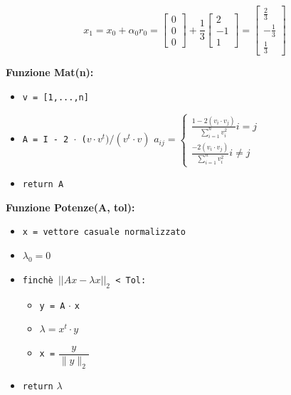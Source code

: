 \documentclass[12pt,a4paper]{article}
\begin{document}
\[
x_1 = x_0 + \alpha_0 r_0 = \begin{bmatrix} 0 \\ 0 \\ 0 \end{bmatrix} + \frac{1}{3} \begin{bmatrix} 2 \\ -1 \\ 1 \end{bmatrix} = \begin{bmatrix} \frac{2}{3} \\ -\frac{1}{3} \\ \frac{1}{3} \end{bmatrix}
\]
\newpage
\noindent
{}

\vspace{1em}
\textbf{Funzione Mat(n):}
\begin{itemize}
  \item \texttt{v = [1,...,n]}
  \item \texttt{A = I - 2 $\cdot$ ($v \cdot v^t) / (v^t \cdot v)$} \Rightarrow   $a_{ij} = \begin{cases} \frac{1-2(v_i \cdot v_j)}{\sum_{i=1}^{n}v_i^2} i=j\\ 
   \frac{-2(v_i \cdot v_j)}{\sum_{i=1}^{n}v_i^2} i\not=j
  
  \end{cases}$
  \item \texttt{return A}
\end{itemize}

\vspace{0.5em}
\textbf{Funzione Potenze(A, tol):}
\begin{itemize}
  \item \texttt{x = vettore casuale normalizzato}
  \item $\lambda_0 = 0$
  \item \texttt{finchè $||Ax-\lambda x||_2$ < Tol:}
  \begin{itemize}
    \item \texttt{y = A} $\cdot$ \texttt{x}
    \item $\lambda = x^t \cdot y$
    \item \texttt{x =} $\dfrac{y}{\lVert y \rVert_2}$
  \end{itemize}
  \item \texttt{return} $\lambda$
\end{itemize}
\end{document}

